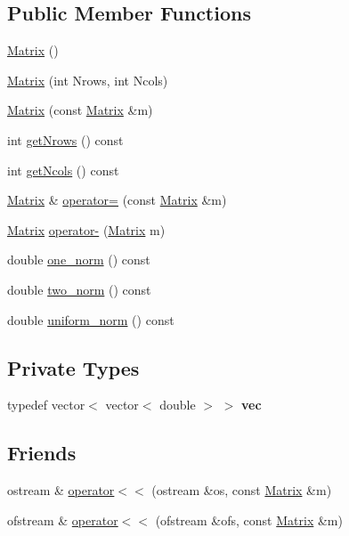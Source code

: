 \subsection*{Public Member Functions}
\begin{DoxyCompactItemize}
\item 
\mbox{\hyperlink{class_matrix_a2dba13c45127354c9f75ef576f49269b}{Matrix}} ()
\item 
\mbox{\hyperlink{class_matrix_a135a15de1126d735bb95fcc839d739d7}{Matrix}} (int Nrows, int Ncols)
\item 
\mbox{\hyperlink{class_matrix_a765f4dcb51b6829311cc3e7576388423}{Matrix}} (const \mbox{\hyperlink{class_matrix}{Matrix}} \&m)
\item 
int \mbox{\hyperlink{class_matrix_a711f84a1c62832d9d197d78c9855a276}{get\+Nrows}} () const
\item 
int \mbox{\hyperlink{class_matrix_ae0a5f2154953b8d129a90b04f91d9079}{get\+Ncols}} () const
\item 
\mbox{\hyperlink{class_matrix}{Matrix}} \& \mbox{\hyperlink{class_matrix_aea5a06385f646eb4a63929fae6fa3e14}{operator=}} (const \mbox{\hyperlink{class_matrix}{Matrix}} \&m)
\item 
\mbox{\hyperlink{class_matrix}{Matrix}} \mbox{\hyperlink{class_matrix_a2aabf841a4302d528f8b102c0800a263}{operator-\/}} (\mbox{\hyperlink{class_matrix}{Matrix}} m)
\item 
double \mbox{\hyperlink{class_matrix_af4d468252f3ecbbcaa5726c76e332b4c}{one\+\_\+norm}} () const
\item 
double \mbox{\hyperlink{class_matrix_aac496af05ec7aa26afc2b9c6d0ab8b66}{two\+\_\+norm}} () const
\item 
double \mbox{\hyperlink{class_matrix_a43066c7fe6418aad40170b85415063e8}{uniform\+\_\+norm}} () const
\end{DoxyCompactItemize}
\subsection*{Private Types}
\begin{DoxyCompactItemize}
\item 
\mbox{\label{class_matrix_a816d2806d2a58c99bce03de4640aeb6a}} 
typedef vector$<$ vector$<$ double $>$ $>$ {\bfseries vec}
\end{DoxyCompactItemize}
\subsection*{Friends}
\begin{DoxyCompactItemize}
\item 
ostream \& \mbox{\hyperlink{class_matrix_a5ed9a90fd6f010e7e9840a17d92d5361}{operator$<$$<$}} (ostream \&os, const \mbox{\hyperlink{class_matrix}{Matrix}} \&m)
\item 
ofstream \& \mbox{\hyperlink{class_matrix_ae0b243a10c750750eb00e9af787ea4b8}{operator$<$$<$}} (ofstream \&ofs, const \mbox{\hyperlink{class_matrix}{Matrix}} \&m)
\end{DoxyCompactItemize}


